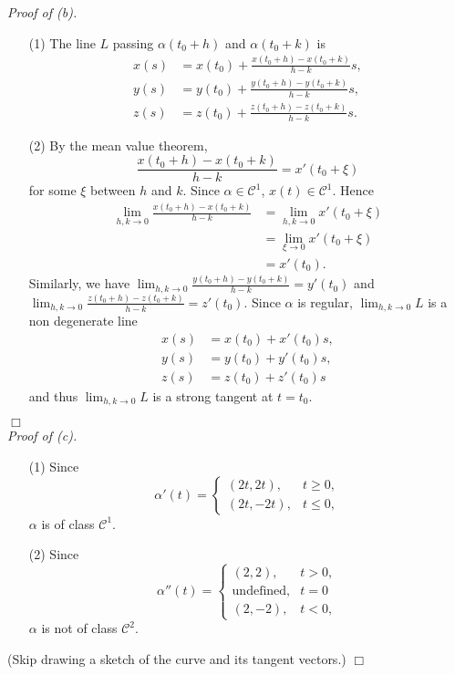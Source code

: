 \documentclass{article}
\begin{document}
\emph{Proof of (b).}
\begin{enumerate}
\item[(1)]
  The line $L$ passing $\alpha(t_0+h)$ and $\alpha(t_0+k)$ is
  \begin{align*}
    x(s) &= x(t_0) + \frac{x(t_0+h)-x(t_0+k)}{h-k} s, \\
    y(s) &= y(t_0) + \frac{y(t_0+h)-y(t_0+k)}{h-k} s, \\
    z(s) &= z(t_0) + \frac{z(t_0+h)-z(t_0+k)}{h-k} s.
  \end{align*}

\item[(2)]
  By the mean value theorem,
  \[
    \frac{x(t_0+h)-x(t_0+k)}{h-k} = x'(t_0 + \xi)
  \]
  for some $\xi$ between $h$ and $k$.
  Since $\alpha \in \mathcal{C}^{1}$, $x(t) \in \mathcal{C}^{1}$.
  Hence
  \begin{align*}
    \lim_{h,k \to 0} \frac{x(t_0+h)-x(t_0+k)}{h-k}
    &=
    \lim_{h,k \to 0} x'(t_0 + \xi) \\
    &=
    \lim_{\xi \to 0} x'(t_0 + \xi) \\
    &= x'(t_0).
  \end{align*}
  Similarly, we have $\lim_{h,k \to 0} \frac{y(t_0+h)-y(t_0+k)}{h-k} = y'(t_0)$ and
  $\lim_{h,k \to 0} \frac{z(t_0+h)-z(t_0+k)}{h-k} = z'(t_0)$.
  Since $\alpha$ is regular,
  $\lim_{h,k \to 0} L$ is a non degenerate line
  \begin{align*}
    x(s) &= x(t_0) + x'(t_0) s, \\
    y(s) &= y(t_0) + y'(t_0) s, \\
    z(s) &= z(t_0) + z'(t_0) s
  \end{align*}
  and thus $\lim_{h,k \to 0} L$ is a strong tangent at $t = t_0$.
\end{enumerate}
$\Box$ \\



\emph{Proof of (c).}
\begin{enumerate}
\item[(1)]
  Since
  \begin{equation*}
    \alpha'(t) =
    \begin{cases}
       (2t,2t), & t \geq 0, \\
       (2t,-2t), & t \leq 0,
    \end{cases}
  \end{equation*}
  $\alpha$ is of class $\mathcal{C}^{1}$.

\item[(2)]
  Since
  \begin{equation*}
    \alpha''(t) =
    \begin{cases}
       (2,2), & t > 0, \\
       \text{undefined}, & t = 0 \\
       (2,-2), & t < 0,
    \end{cases}
  \end{equation*}
  $\alpha$ is not of class $\mathcal{C}^{2}$.
\end{enumerate}
(Skip drawing a sketch of the curve and its tangent vectors.)
$\Box$ \\\\
\end{document}
